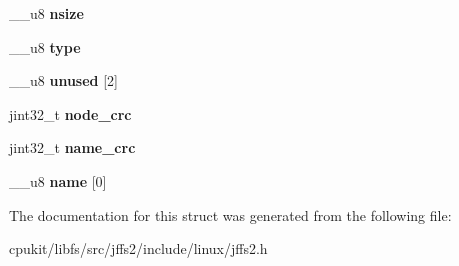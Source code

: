\begin{DoxyCompactItemize}
\+\_\+\+\_\+u8 {\bfseries nsize}
\item 
\mbox{\label{structjffs2__raw__dirent_aec93ead5a83cbe4209a37ea7b8f8ad83}} 
\+\_\+\+\_\+u8 {\bfseries type}
\item 
\mbox{\label{structjffs2__raw__dirent_a3f976b5f55b0390ad7ec2da6f1655e2e}} 
\+\_\+\+\_\+u8 {\bfseries unused} \mbox{[}2\mbox{]}
\item 
\mbox{\label{structjffs2__raw__dirent_ade5ab93cbcfc4e21eb197f6c912972d3}} 
jint32\+\_\+t {\bfseries node\+\_\+crc}
\item 
\mbox{\label{structjffs2__raw__dirent_a7796296e3d34899f36bdb2434fc2b92d}} 
jint32\+\_\+t {\bfseries name\+\_\+crc}
\item 
\mbox{\label{structjffs2__raw__dirent_a827d1baac1ce88b77f91468936702beb}} 
\+\_\+\+\_\+u8 {\bfseries name} \mbox{[}0\mbox{]}
\end{DoxyCompactItemize}


The documentation for this struct was generated from the following file\+:\begin{DoxyCompactItemize}
\item 
cpukit/libfs/src/jffs2/include/linux/jffs2.\+h\end{DoxyCompactItemize}
